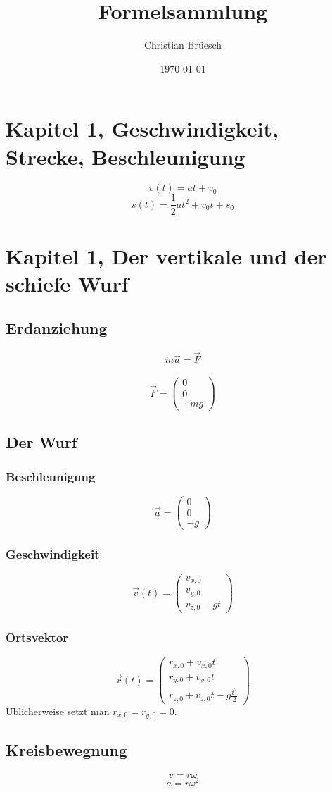 \documentclass[11pt]{article}
\title{Formelsammlung}
\date{\today}
\author{Christian Brüesch}
\begin{document}
\maketitle
\section{Kapitel 1, Geschwindigkeit, Strecke, Beschleunigung}
$$v(t) = at + v_0$$
$$s(t) = \frac{1}{2}at^2 + v_0t + s_0$$
\section{Kapitel 1, Der vertikale und der schiefe Wurf}
\subsection{Erdanziehung}
$$m\overrightarrow{a} = \overrightarrow{F}$$\\
$$\overrightarrow{F}=\left(\begin{array}{c}
0\\
0\\
-mg
\end{array}\right)$$
\subsection{Der Wurf}
\subsubsection{Beschleunigung}
$$\overrightarrow{a} = \left( \begin{array}{c}
0\\
0\\
-g
\end{array} \right)$$
\subsubsection{Geschwindigkeit}
$$\overrightarrow{v}(t) = \left( \begin{array}{c}
v_{x,0}\\
v_{y,0}\\
v_{z,0} - gt
\end{array} \right) $$
\subsubsection{Ortsvektor}
$$\overrightarrow{r}(t) = \left( \begin{array}{c}
r_{x,0} + v_{x,0}t\\
r_{y,0} + v_{y,0}t\\
r_{z,0} + v_{z,0}t - g\frac{t^2}{2}
\end{array} \right) $$
Üblicherweise setzt man $r_{x,0} = r_{y,0} = 0$.
\subsection{Kreisbewegnung}
$$v = r\omega$$
$$a = r\omega^2$$
\end{document}
